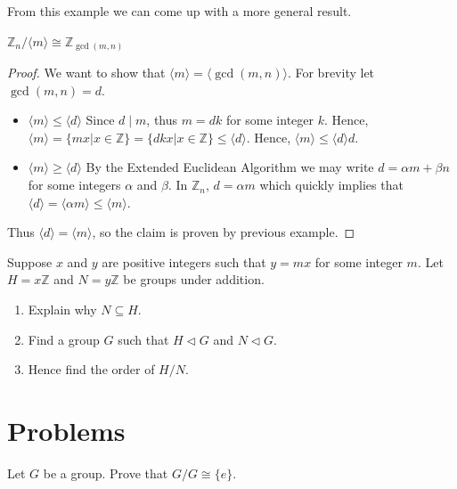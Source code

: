 From this example we can come up with a more general result.
\begin{proposition}\label{prop-Zn-mod-cyclic-subgroup-of-m}
    $\mathbb{Z}_n / \langle m \rangle \cong \mathbb{Z}_{\gcd(m,n)}$
\end{proposition}
\begin{proof}
    We want to show that $\langle m \rangle = \langle \gcd(m,n) \rangle$. For brevity let $\gcd(m,n) = d$.

    \begin{itemize}
        \item $\boxed{\langle m \rangle \leq \langle d \rangle}$ Since $d\;|\;m$, thus $m = dk$ for some integer $k$. Hence, $\langle m \rangle = \{mx \vert x \in \mathbb{Z}\} = \{dkx \vert x \in \mathbb{Z}\} \leq \langle d \rangle$. Hence, $\langle m \rangle \leq \langle d \rangle d$.
        \item $\boxed{\langle m \rangle \geq \langle d \rangle}$ By the Extended Euclidean Algorithm we may write $d = \alpha m + \beta n$ for some integers $\alpha$ and $\beta$. In $\mathbb{Z}_n$, $d = \alpha m$ which quickly implies that $\langle d \rangle = \langle \alpha m \rangle \leq \langle m \rangle$.
    \end{itemize}
    Thus $\langle d \rangle = \langle m \rangle$, so the claim is proven by previous example.
\end{proof}

\begin{exercise}
    Suppose $x$ and $y$ are positive integers such that $y = mx$ for some integer $m$. Let $H = x\mathbb{Z}$ and $N = y\mathbb{Z}$ be groups under addition.
    \begin{enumerate}[label=(\roman*)]
        \item Explain why $N \subseteq H$.
        \item Find a group $G$ such that $H \lhd G$ and $N \lhd G$.
        \item Hence find the order of $H/N$.
    \end{enumerate}
\end{exercise}

\newpage

\section{Problems}
\begin{problem}
    Let $G$ be a group. Prove that $G/G \cong \{e\}$.
\end{problem}

